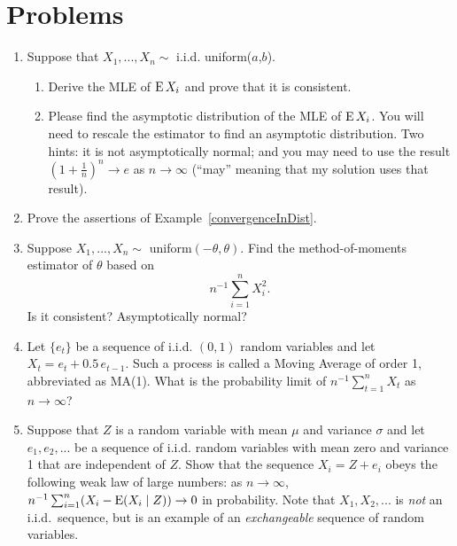 

\section{Problems}

\begin{enumerate}

\item  Suppose that $X_1,...,X_n \sim$ i.i.d. uniform($a$,$b$).
  \begin{enumerate}
  \item Derive the MLE of $\operatorname{E} X_i$ and prove that it is consistent.
  \item Please find the asymptotic distribution of the MLE of $\operatorname{E}
    X_i$.  You will need to rescale the estimator to find an
    asymptotic distribution.  Two hints: it is not asymptotically
    normal; and you may need to use the result $(1 + \tfrac{1}{n})^n \to
    e$ as $n \to \infty$ (``may'' meaning that my solution uses that result).
  \end{enumerate}

\item Prove the assertions of Example~\ref{convergenceInDist}.

\item Suppose $X_1,...,X_n \sim$ uniform$(-\theta, \theta)$.  Find
  the method-of-moments estimator of $\theta$ based on
  \begin{equation*}
    n^{-1} \sum_{i=1}^n X_i^2.
  \end{equation*}
  Is it consistent?  Asymptotically normal?

\item Let $\{e_t\}$ be a sequence of i.i.d. $(0,1)$ random variables
  and let $X_t = e_t + 0.5\, e_{t-1}$.  Such a process is called a
  Moving Average of order 1, abbreviated as MA(1).  What is the
  probability limit of $n^{-1} \sum_{t=1}^n X_t$ as $n \to \infty$?

\item Suppose that $Z$ is a random variable with mean $\mu$ and variance
  $\sigma$ and let $e_1,e_2,...$ be a sequence of i.i.d. random variables with
  mean zero and variance 1 that are independent of $Z$.  Show that the
  sequence $X_i = Z + e_i$ obeys the following weak law of large
  numbers: as $n \to \infty$, $n^{-1} \sum_{i=1}^n ( X_i - \operatorname{E}(X_i \mid Z) ) \to 0$ in
  probability.  Note that $X_1,X_2,...$ is \emph{not} an i.i.d.\ sequence,
  but is an example of an \emph{exchangeable} sequence of random
  variables.


\end{enumerate}
